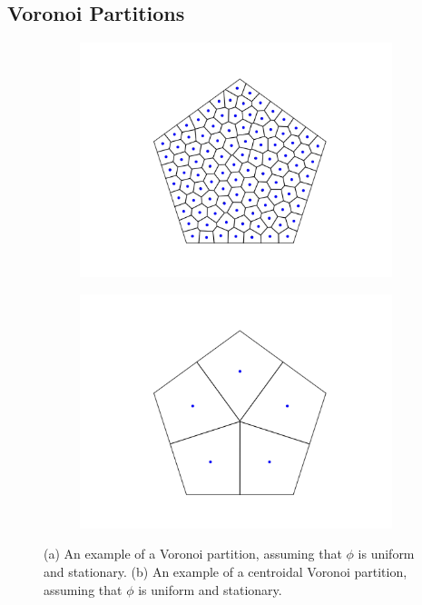 \documentclass[10pt,conference]{IEEEtran}
\begin{document}
	\subsection{Voronoi Partitions}
		\begin{figure}
			\begin{subfigure}{0.2\textwidth}
				\centering 
				\includegraphics[scale=0.2]{fig_ex_2}
				\caption{}
			\end{subfigure}\hspace{\fill}
			\begin{subfigure}{0.2\textwidth}
				\centering 
				\includegraphics[scale=0.2]{fig_ex}
				\caption{}
			\end{subfigure}
			\caption{(a) An example of a Voronoi partition, assuming that $\phi$ is uniform and stationary. (b) An example of a centroidal Voronoi partition, assuming that $\phi$ is uniform and stationary.}
		\end{figure}
\end{document}
